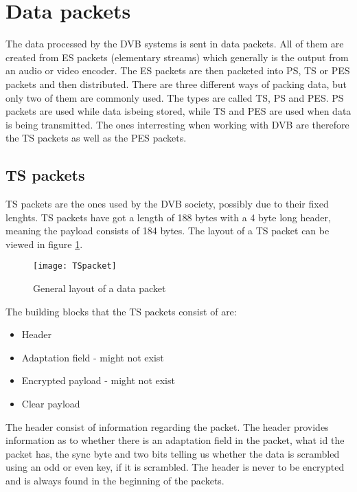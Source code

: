 
\section{Data packets}\label{sec:Data}
The data processed by the DVB systems is sent in data packets. All of them are 
created from ES packets (elementary streams) which generally is the output from 
an audio or video encoder. The ES packets are then packeted into PS, TS or PES 
packets and then distributed. There are three different ways of packing data, 
but only two of them are commonly used. The types are called TS, PS and PES. PS 
packets are used while data isbeing stored, while TS and PES are used when data 
is being transmitted. The ones interresting when working with DVB are therefore 
the TS packets as well as the PES packets.

\subsection{TS packets}
TS packets are the ones used by the DVB society, possibly due to their fixed 
lenghts. TS packets have got a length of 188 bytes with a 4 byte long header, 
meaning the payload consists of 184 bytes. The layout of a TS packet can be 
viewed in figure \ref{img:Package}.

\begin{figure}
  \texttt{[image: TSpacket]}
  \caption{General layout of a data packet \citep{DVB:2013}}
  \label{img:Package}
\end{figure}

The building blocks that the TS packets consist of are:

\begin{itemize}
\item Header
\item Adaptation field - might not exist
\item Encrypted payload - might not exist
\item Clear payload
\end{itemize}

The header consist of information regarding the packet. The header provides 
information as to whether there is an adaptation field in the packet, what id 
the packet has, the sync byte and two bits telling us whether the data is 
scrambled using an odd or even key, if it is scrambled. The header is never to 
be encrypted and is always found in the beginning of the packets.

